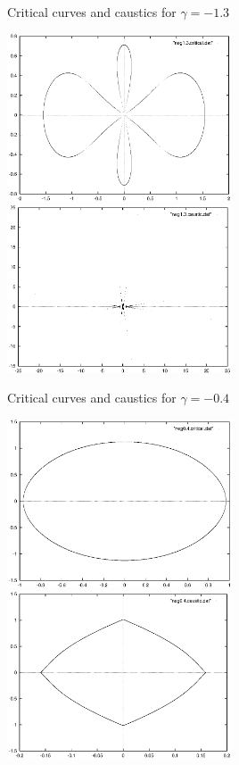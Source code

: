 \documentclass[aspectratio=1610,xcolor=dvipsnames,t]{beamer}
\begin{document}
    \begin{frame}{Critical curves and caustics for $\gamma = -1.3$}
        \begin{center}
                \includegraphics[width=0.5\textwidth]{images/neg1-3-critical.eps}  
                \includegraphics[width=0.5\textwidth]{images/neg1-3-caustic.eps} 
        \end{center}
    \end{frame} 

    \begin{frame}{Critical curves and caustics for $\gamma = -0.4$}
        \begin{center}
                \includegraphics[width=0.5\textwidth]{images/neg0-4-critical.eps} 
                \includegraphics[width=0.5\textwidth]{images/neg0-4-caustic.eps} 
        \end{center}
    \end{frame} 
\end{document}
